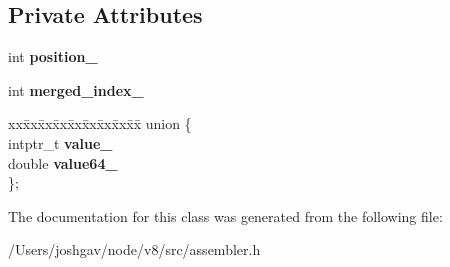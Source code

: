 \subsection*{Private Attributes}
\begin{DoxyCompactItemize}
\item 
int {\bfseries position\+\_\+}\hypertarget{classv8_1_1internal_1_1_constant_pool_entry_a69be31809c8fb62eefe216fdfd50242f}{}\label{classv8_1_1internal_1_1_constant_pool_entry_a69be31809c8fb62eefe216fdfd50242f}

\item 
int {\bfseries merged\+\_\+index\+\_\+}\hypertarget{classv8_1_1internal_1_1_constant_pool_entry_ae1c95cd82cc979e822466a5178ee26b9}{}\label{classv8_1_1internal_1_1_constant_pool_entry_ae1c95cd82cc979e822466a5178ee26b9}

\item 
\begin{tabbing}
xx\=xx\=xx\=xx\=xx\=xx\=xx\=xx\=xx\=\kill
union \{\\
\>intptr\_t {\bfseries value\_}\\
\>double {\bfseries value64\_}\\
\}; \hypertarget{classv8_1_1internal_1_1_constant_pool_entry_afd41002bd15d0a96509b8e4d4a44ae48}{}\label{classv8_1_1internal_1_1_constant_pool_entry_afd41002bd15d0a96509b8e4d4a44ae48}
\\

\end{tabbing}\end{DoxyCompactItemize}


The documentation for this class was generated from the following file\+:\begin{DoxyCompactItemize}
\item 
/\+Users/joshgav/node/v8/src/assembler.\+h\end{DoxyCompactItemize}
